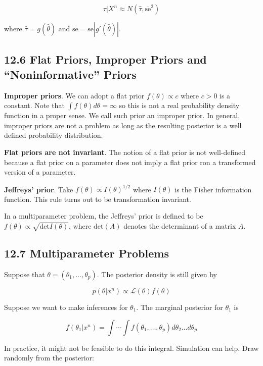 \[ \tau | X^n \approx N(\hat{\tau}, \overline{\text{se}}^2)\]

where \(\hat{\tau} = g(\hat{\theta})\) and
\(\overline{\text{se}} = \text{se} | g'(\hat{\theta}) |\).

\subsection{12.6 Flat Priors, Improper Priors and ``Noninformative''
Priors}\label{flat-priors-improper-priors-and-noninformative-priors}

\textbf{Improper priors}. We can adopt a flat prior
\(f(\theta) \propto c\) where \(c > 0\) is a constant. Note that
\(\int f(\theta) d\theta = \infty\) so this is not a real probability
density function in a proper sense. We call such prior an improper
prior. In general, improper priors are not a problem as long as the
resulting posterior is a well defined probability distribution.

\textbf{Flat priors are not invariant}. The notion of a flat prior is
not well-defined because a flat prior on a parameter does not imply a
flat prior ron a transformed version of a parameter.

\textbf{Jeffreys' prior}. Take \(f(\theta) \propto I(\theta)^{1/2}\)
where \(I(\theta)\) is the Fisher information function. This rule turns
out to be transformation invariant.

In a multiparameter problem, the Jeffreys' prior is defined to be
\(f(\theta) \propto \sqrt{\text{det} I(\theta)}\), where
\(\text{det}(A)\) denotes the determinant of a matrix \(A\).

\subsection{12.7 Multiparameter
Problems}\label{multiparameter-problems}

Suppose that \(\theta = (\theta_1, \dots, \theta_p)\). The posterior
density is still given by

\[p(\theta | x^n) \propto \mathcal{L}(\theta) f(\theta)\]

Suppose we want to make inferences for \(\theta_1\). The marginal
posterior for \(\theta_1\) is

\[ f(\theta_1 | x^n) = \int \cdots \int f(\theta_1, \dots, \theta_p) d\theta_2 \dots d\theta_p\]

In practice, it might not be feasible to do this integral. Simulation
can help. Draw randomly from the posterior:

